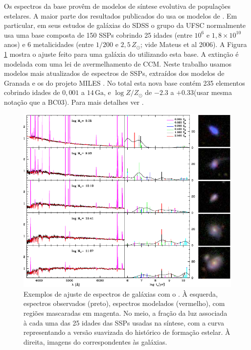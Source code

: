 Os espectros da base provêm de modelos de síntese evolutiva de populações
estelares. A maior parte dos resultados publicados do \starlight usa os modelos
de \citet[BC03]{Bruzual2003}. Em particular, em seus estudos de galáxias do SDSS
o grupo da UFSC normalmente usa uma base composta de 150 SSPs cobrindo 25 idades
(entre $10^6$ e $1,8 \times 10^{10}$ anos) e 6 metalicidades (entre $1/200$ e
$2,5\,Z_\odot$; vide Mateus et al 2006). A Figura
\ref{fig:StarlightSpectrumSample} mostra o ajuste feito para uma galáxia do
\SDSS utilizando esta base. A extinção é modelada com uma lei de avermelhamento
de CCM. Neste trabalho usamos modelos mais atualizados de espectros de SSPs,
extraídos dos modelos de Granada \citep[para idades até
$63\,\mathrm{Ma}$]{GonzalezDelgado2005} e os do projeto MILES
\citep{Vazdekis2010}. No total esta nova base contém 235 elementos cobrindo
idades de  $0,001$ a $14\,\mathrm{Ga}$, e $\log Z/Z_\odot$ de $-2.3$ a
$+0.33$\fixme(usar mesma notação que a BC03).
Para mais detalhes ver \citet{GonzalezDelgado2014b, GonzalezDelgado2014a}.

\begin{figure}
	\includegraphics[width=1.0\textwidth]{figuras/starlight-fit}
	\caption[Exemplos de ajuste de espectro com o \starlight.]
	{Exemplos de ajuste de espectros de galáxias com o \starlight
	\citep{Asari2007}. À esquerda, espectros observados (preto), espectros
	modelados (vermelho), com regiões mascaradas em magenta. No meio, a fração da
	luz associada à cada uma das 25 idades das SSPs usadas na síntese, com a curva
	representando a versão suavizada do histórico de formação estelar. À direita,
	imagens do \SDSS correspondentes às galáxias.}
	\label{fig:StarlightSpectrumSample}
\end{figure}

